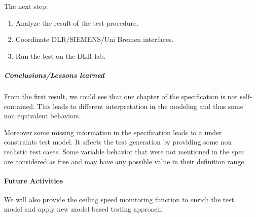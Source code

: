 \documentclass{article}
\begin{document}
 The next step:
 \begin{enumerate}
 \item Analyze the result of the test procedure.
 \item Coordinate DLR/SIEMENS/Uni Bremen interfaces.
 \item Run the test on the DLR lab.
 \end{enumerate}
\subparagraph{Conclusions/Lessons learned}
From the first result, we could see that one chapter of
the specification is not self-contained. This leads to different
interpretation in the modeling and thus some non equivalent behaviors.

Moreover some missing information in the specification leads to a
under constraints test model. It affects the test generation by
providing some non realistic test cases. Some variable behavior that
were not mentioned in the spec are considered as free and may have any
possible value in their definition range.
 


\paragraph{Future Activities}
We will also provide the ceiling speed monitoring function to enrich
the test model and apply new model based testing approach.


\end{document}
